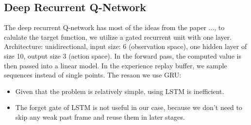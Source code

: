 \documentclass[twoside,11pt]{article}
\begin{document}
\subsection{Deep Recurrent Q-Network}
The deep recurrent Q-network has most of the ideas from the paper ..., to calulate the target function, we utilize a gated recurrent unit with one layer. Architecture: unidirectional, input size: 6 (observation space), one hidden layer of size 10, output size 3 (action space). In the forward pass, the computed value is then passed into a linear model. In the experience replay buffer, we sample sequences instead of single points.
\newline
The resaon we use GRU: \newline
\begin{itemize}
\item Given that the problem is relatively simple, using LSTM is inefficient.
\item The forget gate of LSTM is not useful in our case, because we don't need to skip any weak past frame and reuse them in later stages. 
\end{itemize}

\end{document}
